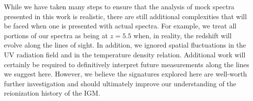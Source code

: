 While we have taken many steps to ensure that the analysis of mock spectra presented in this work is realistic, there are still additional complexities that will be faced when one is presented with actual spectra. For example, we treat all portions of our spectra as being at $z = 5.5$ when, in reality, the redshift will evolve along the lines of sight. In addition, we ignored spatial fluctuations in the UV
radiation field and in the temperature density relation. Additional work will certainly be required to definitively interpret future measurements along the lines we suggest here.
However, we believe the signatures explored here are well-worth further investigation and should ultimately improve our understanding of the reionization history of the IGM.


%
%
%

